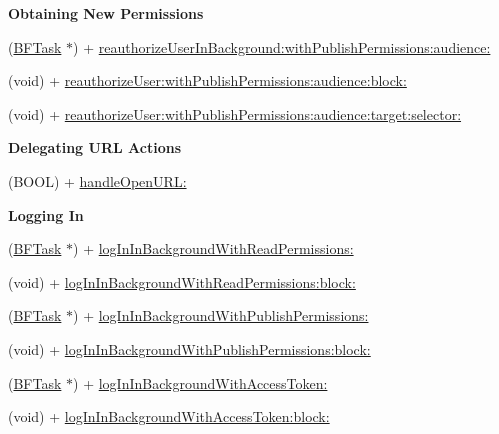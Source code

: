 \begin{Indent}{\bf Obtaining New Permissions}\par
{\em 

 

 }\begin{DoxyCompactItemize}
\item 
(\hyperlink{interface_b_f_task}{B\+F\+Task} $\ast$) + \hyperlink{interface_p_f_facebook_utils_ab593d5d5ade08e1f53569e44f52a377c}{reauthorize\+User\+In\+Background\+:with\+Publish\+Permissions\+:audience\+:}
\item 
(void) + \hyperlink{interface_p_f_facebook_utils_af4f6bab0c066086a8d03bd727aa7420b}{reauthorize\+User\+:with\+Publish\+Permissions\+:audience\+:block\+:}
\item 
(void) + \hyperlink{interface_p_f_facebook_utils_a64fdf4143c85349854616129376506f2}{reauthorize\+User\+:with\+Publish\+Permissions\+:audience\+:target\+:selector\+:}
\end{DoxyCompactItemize}
\end{Indent}
\begin{Indent}{\bf Delegating U\+R\+L Actions}\par
{\em 

 

 }\begin{DoxyCompactItemize}
\item 
(B\+O\+O\+L) + \hyperlink{interface_p_f_facebook_utils_adbc30b3397cc07f57110eb843e79918e}{handle\+Open\+U\+R\+L\+:}
\end{DoxyCompactItemize}
\end{Indent}
\begin{Indent}{\bf Logging In}\par
{\em 

 

 }\begin{DoxyCompactItemize}
\item 
(\hyperlink{interface_b_f_task}{B\+F\+Task} $\ast$) + \hyperlink{interface_p_f_facebook_utils_aef2e0ccf75c2b4f2ccd8ce7bd8aba564}{log\+In\+In\+Background\+With\+Read\+Permissions\+:}
\item 
(void) + \hyperlink{interface_p_f_facebook_utils_a28b28daee0c4d91b6f8bb6a707b00453}{log\+In\+In\+Background\+With\+Read\+Permissions\+:block\+:}
\item 
(\hyperlink{interface_b_f_task}{B\+F\+Task} $\ast$) + \hyperlink{interface_p_f_facebook_utils_ac3eb73a12b63e52370d8e19196392aa2}{log\+In\+In\+Background\+With\+Publish\+Permissions\+:}
\item 
(void) + \hyperlink{interface_p_f_facebook_utils_a0d3534e5a1eb19447819742a85f21850}{log\+In\+In\+Background\+With\+Publish\+Permissions\+:block\+:}
\item 
(\hyperlink{interface_b_f_task}{B\+F\+Task} $\ast$) + \hyperlink{interface_p_f_facebook_utils_abc3ba39fcb6381beea0748c80cba18a7}{log\+In\+In\+Background\+With\+Access\+Token\+:}
\item 
(void) + \hyperlink{interface_p_f_facebook_utils_a25c538d6c7c3891d541832229bd72e3e}{log\+In\+In\+Background\+With\+Access\+Token\+:block\+:}
\end{DoxyCompactItemize}
\end{Indent}
